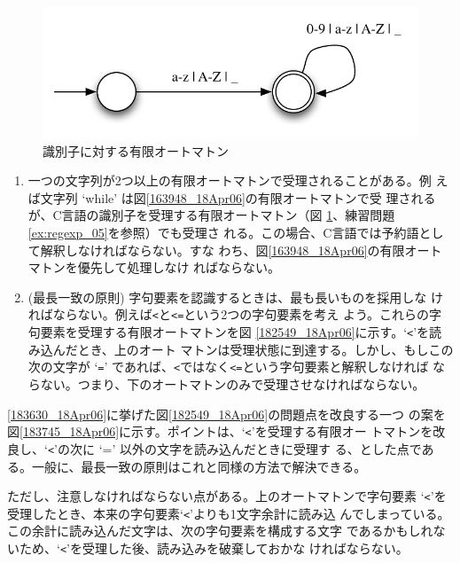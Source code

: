 \begin{figure}
 \begin{center}
  \includegraphics{figure/fa_identifier.pdf}
 \end{center}
 \caption{識別子に対する有限オートマトン}
 \label{081246_19Apr06}
\end{figure}
\begin{enumerate}
 \item 一つの文字列が2つ以上の有限オートマトンで受理されることがある。例
       えば文字列 `while' は図\ref{163948_18Apr06}の有限オートマトンで受
       理されるが、C言語の識別子を受理する有限オートマトン（図
       \ref{081246_19Apr06}、練習問題\ref{ex:regexp_05}を参照）でも受理さ
       れる。この場合、C言語では予約語として解釈しなければならない。すな
       わち、図\ref{163948_18Apr06}の有限オートマトンを優先して処理しなけ
       ればならない。
 \item (最長一致の原則) 字句要素を認識するときは、最も長いものを採用しな
       ければならない。例えば\verb|<|と\verb|<=|という2つの字句要素を考え
       よう。これらの字句要素を受理する有限オートマトンを図
       \ref{182549_18Apr06}に示す。`\verb|<|'を読み込んだとき、上のオート
       マトンは受理状態に到達する。しかし、もしこの次の文字が `\verb|=|'
       であれば、\verb|<|ではなく\verb|<=|という字句要素と解釈しなければ
       ならない。つまり、下のオートマトンのみで受理させなければならない。
       \label{183630_18Apr06}
\end{enumerate}

\ref{183630_18Apr06}に挙げた図\ref{182549_18Apr06}の問題点を改良する一つ
の案を図\ref{183745_18Apr06}に示す。ポイントは、`\verb|<|'を受理する有限オー
トマトンを改良し、`\verb|<|'の次に `=' 以外の文字を読み込んだときに受理す
る、とした点である。一般に、最長一致の原則はこれと同様の方法で解決できる。

ただし、注意しなければならない点がある。上のオートマトンで字句要素
`\verb|<|'を受理したとき、本来の字句要素`\verb|<|'よりも1文字余計に読み込
んでしまっている。この余計に読み込んだ文字は、次の字句要素を構成する文字
であるかもしれないため、`\verb|<|'を受理した後、読み込みを破棄しておかな
ければならない。

